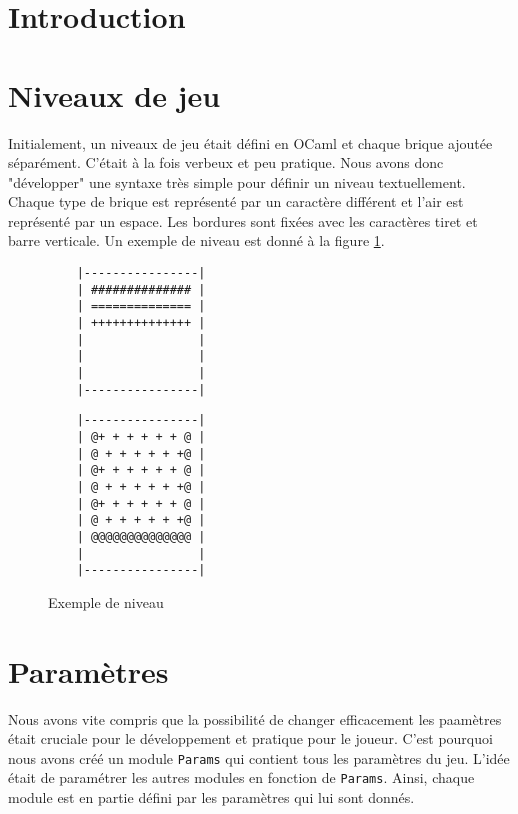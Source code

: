 \documentclass[french]{template}
\begin{document}

\fairemarges
\fairepagedegarde
\tabledematieres

\section{Introduction}

\section{Niveaux de jeu}

Initialement, un niveaux de jeu était défini en OCaml et chaque brique ajoutée séparément. C'était à la fois verbeux et peu pratique. Nous avons donc "développer" une syntaxe très simple pour définir un niveau textuellement. Chaque type de brique est représenté par un caractère différent et l'air est représenté par un espace. Les bordures sont fixées avec les caractères tiret et barre verticale. Un exemple de niveau est donné à la figure \ref{fig:level.txt}.

\begin{figure}[h]
    \begin{verbatim}
    |----------------|
    | ############## |
    | ============== |
    | ++++++++++++++ |
    |                |
    |                |
    |                |
    |----------------|
\end{verbatim}
    \begin{verbatim}
    |----------------|
    | @+ + + + + + @ |
    | @ + + + + + +@ |
    | @+ + + + + + @ |
    | @ + + + + + +@ |
    | @+ + + + + + @ |
    | @ + + + + + +@ |
    | @@@@@@@@@@@@@@ |
    |                |
    |----------------|
    \end{verbatim}
    \caption{Exemple de niveau}
    \label{fig:level.txt}
\end{figure}

\section{Paramètres}

Nous avons vite compris que la possibilité de changer efficacement les paamètres était cruciale pour le développement et pratique pour le joueur. C'est pourquoi nous avons créé un module \texttt{Params} qui contient tous les paramètres du jeu. L'idée était de paramétrer les autres modules en fonction de \texttt{Params}. Ainsi, chaque module est en partie défini par les paramètres qui lui sont donnés.
\end{document}
